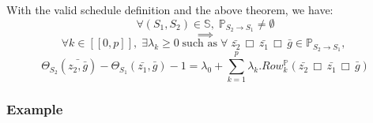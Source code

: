 	With the valid schedule definition and the above theorem, we have: 
	$$ \forall (S_{1}, S_{2}) \in \mathbb{S}, \; \mathbb{P}_{S_{2} \rightarrow S_{1}} \neq \emptyset $$
	$$ \implies $$
	$$ \forall k \in [\![ 0, p ]\!], \; \exists \lambda_{k} \geq 0 \;\text{such as}\;
	\forall \; \bar{z_{2}} \,\Box\, \bar{z_{1}} \,\Box\, \bar{g} \in \mathbb{P}_{S_{2} \rightarrow S_{1}}, \; $$
	$$ \Theta_{S_{2}}(\bar{z_{2}, \bar{g}}) - \Theta_{S_{1}}(\bar{z_{1}}, \bar{g}) - 1 =
	\lambda_{0} + \sum_{k = 1}^{p} \lambda_{k} . Row_{k}^{\mathbb{P}}(\bar{z_{2}} \,\Box\, \bar{z_{1}} \,\Box\, \bar{g}) $$

			\subsubsection{Example}
			\label{polyhedric:schedule:vss:example}


